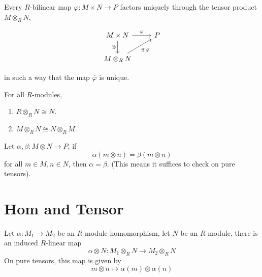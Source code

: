 \documentclass[openany]{book}
\begin{document}
\begin{prop}
    Every $R$-bilinear map $\varphi: M \times N \to P$ factors uniquely through the tensor product $M \otimes_R N$,
\begin{center}
    \[\begin{tikzcd}
        {M\times N} & P \\
        {M\otimes_RN}
        \arrow["\varphi", from=1-1, to=1-2]
        \arrow["\otimes"', from=1-1, to=2-1]
        \arrow["{\exists!\bar{\varphi}}"', from=2-1, to=1-2]
    \end{tikzcd}\]
\end{center}
in such a way that the map $\overline{\varphi}$ is unique.
\end{prop}
\begin{example}
    For all $R$-modules, 
    \begin{enumerate}
        \item $R\otimes_RN\cong N$.
        \item $M\otimes_RN\cong N\otimes_RM$.
    \end{enumerate}
\end{example}

\begin{prop}
    Let $\alpha,\beta:M\otimes N\to P$, if 
    \begin{equation*}
        \alpha(m\otimes n)=\beta(m\otimes n)
    \end{equation*}
    for all $m\in M, n\in N$, then $\alpha=\beta$. (This means it suffices to check on pure tensors).
\end{prop}



\section{Hom and Tensor}


\begin{prop}
    Let $\alpha:M_1\to M_2$ be an $R$-module homomorphism, let $N$ be an $R$-module, there is an induced $R$-linear map 
    \begin{equation*}
        \alpha\otimes N: M_1\otimes_R N\to M_2\otimes_R N
    \end{equation*}
    On pure tensors, this map is given by 
    \begin{equation*}
        m\otimes n\mapsto \alpha(m)\otimes\alpha(n)
    \end{equation*}

\end{prop}
\end{document}
